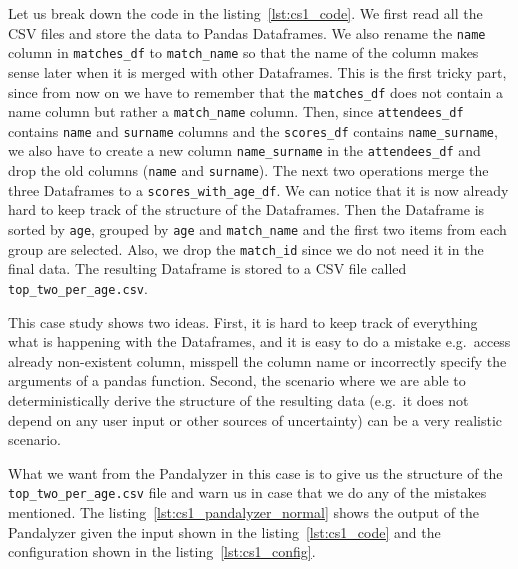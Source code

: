 Let us break down the code in the listing~\ref{lst:cs1_code}.
We first read all the CSV files and store the data to Pandas Dataframes.
We also rename the \verb|name| column in \verb|matches_df| to \verb|match_name| so that the name of the column makes
sense later when it is merged with other Dataframes.
This is the first tricky part, since from now on we have to remember that the \verb|matches_df| does not contain a name
column but rather a \verb|match_name| column.
Then, since \verb|attendees_df| contains \verb|name| and \verb|surname| columns and the \verb|scores_df| contains
\verb|name_surname|, we also have to create a new column \verb|name_surname| in the \verb|attendees_df| and drop the
old columns (\verb|name| and \verb|surname|).
The next two operations merge the three Dataframes to a \verb|scores_with_age_df|.
We can notice that it is now already hard to keep track of the structure of the Dataframes.
Then the Dataframe is sorted by \verb|age|, grouped by \verb|age| and \verb|match_name| and the first two items from each group are selected.
Also, we drop the \verb|match_id| since we do not need it in the final data.
The resulting Dataframe is stored to a CSV file called \verb|top_two_per_age.csv|.

This case study shows two ideas.
First, it is hard to keep track of everything what is happening with the Dataframes, and it is easy to do a mistake
e.g.~access already non-existent column, misspell the column name or incorrectly specify the arguments of a pandas function.
Second, the scenario where we are able to deterministically derive the structure of the resulting data (e.g.~it does not
depend on any user input or other sources of uncertainty) can be a very realistic scenario. %

What we want from the Pandalyzer in this case is to give us the structure of the \verb|top_two_per_age.csv| file
and warn us in case that we do any of the mistakes mentioned.
The listing~\ref{lst:cs1_pandalyzer_normal} shows the output of the Pandalyzer given the input shown in the
listing~\ref{lst:cs1_code} and the configuration shown in the listing~\ref{lst:cs1_config}.

